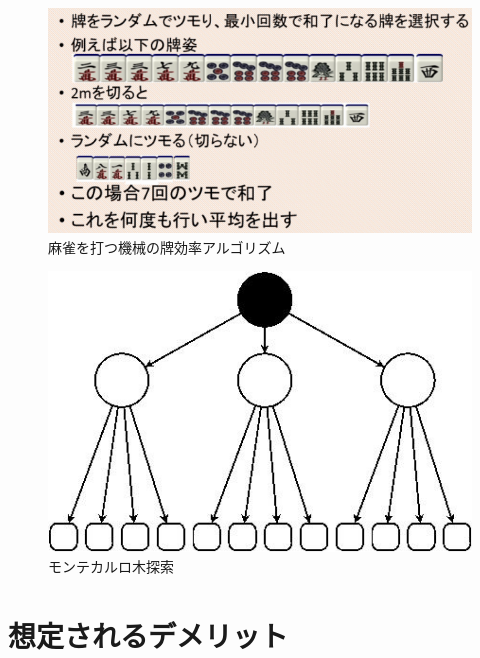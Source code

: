 \begin{figure}[h]
 \centering
 \includegraphics[keepaspectratio, scale=0.3,bb=0 0 100 300]
      {img/monte1.png}
 \caption{麻雀を打つ機械の牌効率アルゴリズム}
 \label{monte1}
\end{figure}

\begin{figure}[h]
 \centering
 \includegraphics[keepaspectratio, scale=0.5,bb=0 0 300 121]
      {img/monte.jpg}
 \caption{モンテカルロ木探索}
 \label{monte2}
\end{figure}


\section{想定されるデメリット}



